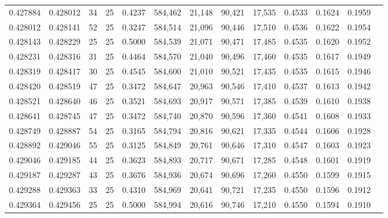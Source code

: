 \begin{tabular}{rrrrrrrrrrrrr}
0.427884 & 0.428012 &    34 &  25 &                                     0.4237 & 584,462 &  21,148 &  90,421 &  17,535 & 0.4533 & 0.1624 & 0.1959 \\
0.428012 & 0.428141 &    52 &  25 &                                     0.3247 & 584,514 &  21,096 &  90,446 &  17,510 & 0.4536 & 0.1622 & 0.1954 \\
0.428143 & 0.428229 &    25 &  25 &                                     0.5000 & 584,539 &  21,071 &  90,471 &  17,485 & 0.4535 & 0.1620 & 0.1952 \\
0.428231 & 0.428316 &    31 &  25 &                                     0.4464 & 584,570 &  21,040 &  90,496 &  17,460 & 0.4535 & 0.1617 & 0.1949 \\
0.428319 & 0.428417 &    30 &  25 &                                     0.4545 & 584,600 &  21,010 &  90,521 &  17,435 & 0.4535 & 0.1615 & 0.1946 \\
0.428420 & 0.428519 &    47 &  25 &                                     0.3472 & 584,647 &  20,963 &  90,546 &  17,410 & 0.4537 & 0.1613 & 0.1942 \\
0.428521 & 0.428640 &    46 &  25 &                                     0.3521 & 584,693 &  20,917 &  90,571 &  17,385 & 0.4539 & 0.1610 & 0.1938 \\
0.428641 & 0.428745 &    47 &  25 &                                     0.3472 & 584,740 &  20,870 &  90,596 &  17,360 & 0.4541 & 0.1608 & 0.1933 \\
0.428749 & 0.428887 &    54 &  25 &                                     0.3165 & 584,794 &  20,816 &  90,621 &  17,335 & 0.4544 & 0.1606 & 0.1928 \\
0.428892 & 0.429046 &    55 &  25 &                                     0.3125 & 584,849 &  20,761 &  90,646 &  17,310 & 0.4547 & 0.1603 & 0.1923 \\
0.429046 & 0.429185 &    44 &  25 &                                     0.3623 & 584,893 &  20,717 &  90,671 &  17,285 & 0.4548 & 0.1601 & 0.1919 \\
0.429187 & 0.429287 &    43 &  25 &                                     0.3676 & 584,936 &  20,674 &  90,696 &  17,260 & 0.4550 & 0.1599 & 0.1915 \\
0.429288 & 0.429363 &    33 &  25 &                                     0.4310 & 584,969 &  20,641 &  90,721 &  17,235 & 0.4550 & 0.1596 & 0.1912 \\
0.429364 & 0.429456 &    25 &  25 &                                     0.5000 & 584,994 &  20,616 &  90,746 &  17,210 & 0.4550 & 0.1594 & 0.1910 \\

\end{tabular}
